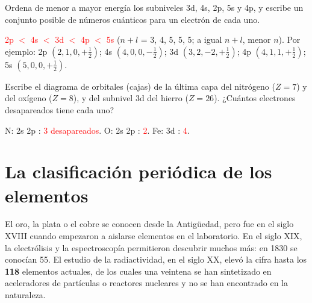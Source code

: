 \begin{exercise}
    Ordena de menor a mayor energía los subniveles 3d, 4s, 2p, 5s y 4p, y escribe un conjunto posible de números cuánticos para
    un electrón de cada uno.
    \begin{solu}
        \textcolor{red}{2p \(<\) 4s \(<\) 3d \(<\) 4p \(<\) 5s} (\(n + l\) = 3, 4, 5, 5, 5; a igual \(n + l\), menor \(n\)).
        Por ejemplo: 2p \((2, 1, 0, +\frac{1}{2})\); 4s \((4, 0, 0, -\frac{1}{2})\); 3d \((3, 2, -2, +\frac{1}{2})\);
        4p \((4, 1, 1, +\frac{1}{2})\); 5s \((5, 0, 0, +\frac{1}{2})\).
    \end{solu}
\end{exercise}

\begin{exercise}
    Escribe el diagrama de orbitales (cajas) de la última capa del nitrógeno (\(Z = 7\)) y del oxígeno (\(Z = 8\)), y del subnivel
    3d del hierro (\(Z = 26\)). ¿Cuántos electrones desapareados tiene cada uno?
    \begin{solu}
        N: 2s \orbcaja{\uparrow\downarrow} 2p \orbcaja{\uparrow}\orbcaja{\uparrow}\orbcaja{\uparrow}: \textcolor{red}{3 desapareados}.
        O: 2s \orbcaja{\uparrow\downarrow} 2p \orbcaja{\uparrow\downarrow}\orbcaja{\uparrow}\orbcaja{\uparrow}: \textcolor{red}{2}.
        Fe: 3d \orbcaja{\uparrow\downarrow}\orbcaja{\uparrow}\orbcaja{\uparrow}\orbcaja{\uparrow}\orbcaja{\uparrow}: \textcolor{red}{4}.
    \end{solu}
\end{exercise}

\section{La clasificación periódica de los elementos}\label{sec:ud3-tabla}

El oro, la plata o el cobre se conocen desde la Antigüedad, pero fue en el siglo XVIII cuando empezaron a aislarse elementos en
el laboratorio. En el siglo XIX, la electrólisis y la espectroscopía permitieron descubrir muchos más: en 1830 se conocían 55. El
estudio de la radiactividad, en el siglo XX, elevó la cifra hasta los \textbf{118} elementos actuales, de los cuales una veintena
se han sintetizado en aceleradores de partículas o reactores nucleares y no se han encontrado en la naturaleza.

